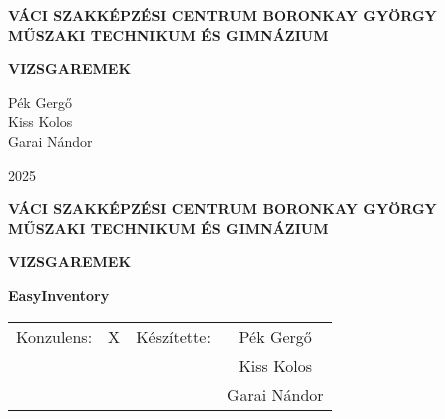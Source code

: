 \begin{titlepage}
	\begin{center}
		\textbf{VÁCI SZAKKÉPZÉSI CENTRUM BORONKAY GYÖRGY MŰSZAKI TECHNIKUM ÉS GIMNÁZIUM}

		\vfill

		\textbf{VIZSGAREMEK}

		\vfill

		Pék Gergő \\
		Kiss Kolos \\
		Garai Nándor

		2025
	\end{center}
\end{titlepage}

\begin{center}
	\textbf{VÁCI SZAKKÉPZÉSI CENTRUM BORONKAY GYÖRGY MŰSZAKI TECHNIKUM ÉS GIMNÁZIUM}

	\vfill

	

	\textbf{VIZSGAREMEK}

	\textbf{EasyInventory}

	\vfill

	\begin{tabular}{ c c c c }
		Konzulens: & X & Készítette: & Pék Gergő \\
		& & & Kiss Kolos \\
		& & & Garai Nándor
	\end{tabular}
\end{center}
\newpage

